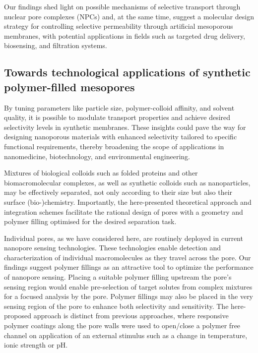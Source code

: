 \documentclass[12pt, a4paper]{article}
\begin{document}
Our findings shed light on possible mechanisms of selective transport through nuclear pore complexes (NPCs) and, at the same time, suggest a molecular design strategy for controlling selective permeability through artificial mesoporous membranes, with potential applications in fields such as targeted drug delivery, biosensing, and filtration systems.

\subsection{Towards technological applications of synthetic polymer-filled mesopores}

By tuning parameters like particle size, polymer-colloid affinity, and solvent quality, it is possible to modulate transport properties and achieve desired selectivity levels in synthetic membranes.
These insights could pave the way for designing nanoporous materials with enhanced selectivity tailored to specific functional requirements, thereby broadening the scope of applications in nanomedicine, biotechnology, and environmental engineering.

Mixtures of biological colloids such as folded proteins and other biomacromolecular complexes, as well as synthetic colloids such as nanoparticles, may be effectively separated, not only according to their size but also their surface (bio-)chemistry.
Importantly, the here-presented theoretical approach and integration schemes facilitate the rational design of pores with a geometry and polymer filling optimised for the desired separation task.

Individual pores, as we have considered here, are routinely deployed in current nanopore sensing technologies.
These technologies enable detection and characterization of individual macromolecules as they travel across the pore.
Our findings suggest polymer fillings as an attractive tool to optimize the performance of nanopore sensing.
Placing a suitable polymer filling upstream the pore's sensing region would enable pre-selection of target solutes from complex mixtures for a focused analysis by the pore.
Polymer fillings may also be placed in the very sensing region of the pore to enhance both selectivity and sensitivity.
The here-proposed approach is distinct from previous approaches, where responsive polymer coatings along the pore walls were used to open/close a polymer free channel on application of an external stimulus such as a change in temperature, ionic strength or pH. 
\end{document}
